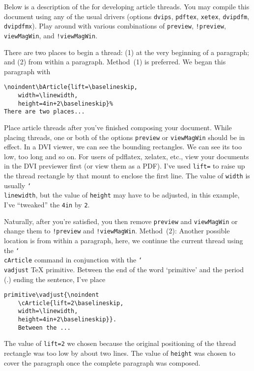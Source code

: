 \documentclass{article}
\providecommand{\cs}[1]{\texttt{\char`\\#1}}
\begin{document}


\noindent
Below is a description of the 
for developing article threads. You
may compile this document using any of the usual drivers (options
\texttt{dvips}, \texttt{pdftex}, \texttt{xetex}, \texttt{dvipdfm}, \texttt{dvipdfmx}).
Play around with various combinations of \texttt{preview}, \texttt{!preview},
\texttt{viewMagWin}, and \texttt{!viewMagWin}.


\begin{multicols}{2}
\noindent{}%
There are two places to begin a thread: (1) at the very beginning of a paragraph;
and (2) from within a paragraph. Method~(1) is preferred. We began this paragraph
with
\begin{Verbatim}[xleftmargin=\parindent,fontsize=\small]
\noindent\bArticle{lift=\baselineskip,
    width=\linewidth,
    height=4in+2\baselineskip}%
There are two places...
\end{Verbatim}
Place article threads after you've finished composing your document. While
placing threads, one or both of the  options \texttt{preview} or
\texttt{viewMagWin} should be in effect. In a \textsf{DVI} viewer, we can see
the bounding rectangles. We can see its too low, too long and so on. For
users of \textsf{pdflatex}, \textsf{xelatex}, etc., view your documents in
the \textsf{DVI} previewer first (or view them as a \textsf{PDF}). I've used
\texttt{lift=\string\baselineskip} to raise up the thread rectangle by that
mount to enclose the first line. The value of \texttt{width} is usually
\cs{linewidth}, but the value of \texttt{height} may have to be adjusted, in
this example, I've ``tweaked'' the \texttt{4in} by
\texttt{2\string\baselineskip}.

Naturally, after you're satisfied, you then remove \texttt{preview} and
\texttt{viewMagWin} or change them to \texttt{!preview} and
\texttt{!viewMagWin}. Method~(2): Another possible location is from within a
paragraph, here, we continue the current thread using the \cs{cArticle}
command in conjunction with the \cs{vadjust} {\TeX}
primitive.
Between the end of the word `primitive' and the period (.) ending the
sentence, I've place
\begin{Verbatim}[xleftmargin=\parindent,fontsize=\small]
primitive\vadjust{\noindent
    \cArticle{lift=2\baselineskip,
    width=\linewidth,
    height=4in+2\baselineskip}}.
    Between the ...
\end{Verbatim}
The value of \texttt{lift=2\string\baselineskip} we chosen because the
original positioning of the thread rectangle was too low by about two lines.
The value of \texttt{height} was chosen to cover the paragraph once the
complete paragraph was composed.


\end{multicols}
\end{document}
